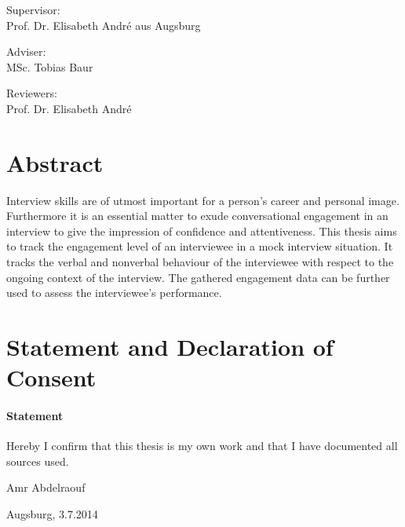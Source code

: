 \documentclass[12pt, a4paper, fleqn]{memoir}%
\begin{document}
\vspace{2.0em}
\begin{center}
    \normalsize
    Supervisor:\\ 
    Prof. Dr. Elisabeth Andr\'{e} aus Augsburg
\end{center}
\begin{center}
    \normalsize
    Adviser:\\
    MSc. Tobias Baur
\end{center}
\begin{center}
    \normalsize
    Reviewers:\\
    Prof. Dr. Elisabeth Andr\'{e}\\
\end{center}
\cleardoublepage

\chapter*{Abstract}
Interview skills are of utmost important for a person's career and personal image. Furthermore it is an essential matter to exude conversational engagement in an interview to give the impression of confidence and attentiveness. This thesis aims to track the engagement level of an interviewee in a mock interview situation. It tracks the verbal and nonverbal behaviour of the interviewee with respect to the ongoing context of the interview. The gathered engagement data can be further used to assess the interviewee's performance.

\chapter*{Statement and Declaration of Consent}
\vfill
\subsubsection*{\LARGE Statement}
Hereby I confirm that this thesis is my own work and that I have documented all sources used.
\vfill
\begin{flushleft}
Amr Abdelraouf
\end{flushleft}  
\begin{flushright}
Augsburg, 3.7.2014 
\end{flushright}
\vfill
\vfill
\end{document}
